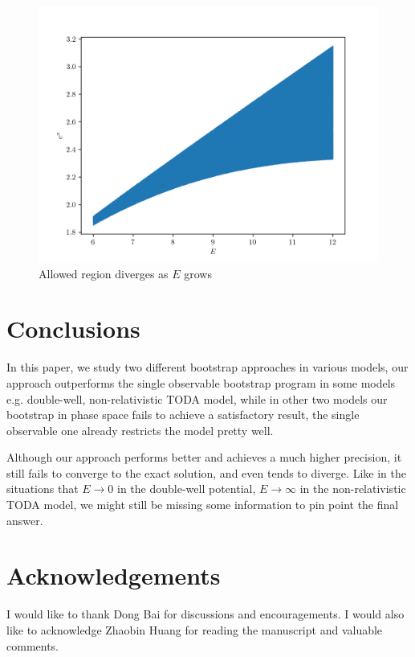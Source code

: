 \documentclass[aps, preprint,amsmath, amssymb]{revtex4-2}
\begin{document}
\begin{figure}
    \includegraphics[width=0.8\linewidth]{todal.png}
    \caption{Allowed region diverges as $E$ grows}
    \label{fig:todal}
\end{figure}

\section{Conclusions}
In this paper, we study two different bootstrap approaches in various models, our approach outperforms the single observable bootstrap program in some models e.g. double-well, non-relativistic TODA model, while in other two models our bootstrap in phase space fails to achieve a satisfactory result, the single observable one already restricts the model pretty well.

Although our approach performs better and achieves a much higher precision, it still fails to converge to the exact solution, and even tends to diverge. Like in the situations that $E \to 0$ in the double-well potential, $E \to \infty$ in the non-relativistic TODA model, we might still be missing some information to pin point the final answer.

\section*{Acknowledgements}
I would like to thank Dong Bai for discussions and encouragements. I would also like to acknowledge Zhaobin Huang for reading the manuscript and valuable comments.


\end{document}
